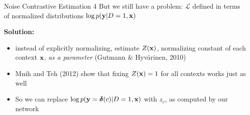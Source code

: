 \documentclass{beamer}
\begin{document}
\begin{frame}{Noise Contrastive Estimation 4}
But we still have a problem: $\mathcal{L}$ defined in terms of normalized distributions $\log p(\mathbf{y}|D=1, \mathbf{x})$

\textbf{Solution:} 
\begin{itemize}
\item instead of explicitly normalizing, estimate $Z({\mathbf{x}})$, normalizing constant of each context $\mathbf{x}$, \textit{as a parameter} (Gutmann \& Hyv{\"a}rinen, 2010)
\item  Mnih and Teh (2012) show that fixing $Z({\mathbf{x}})=1$ for all contexts works just as well
\item So we can replace $\log p(\mathbf{y} = \boldsymbol{\delta}(c)|D=1, \mathbf{x})$ with $z_c$, as computed by our network
\end{itemize}

%
%
\end{frame}


%
%
\end{document}

